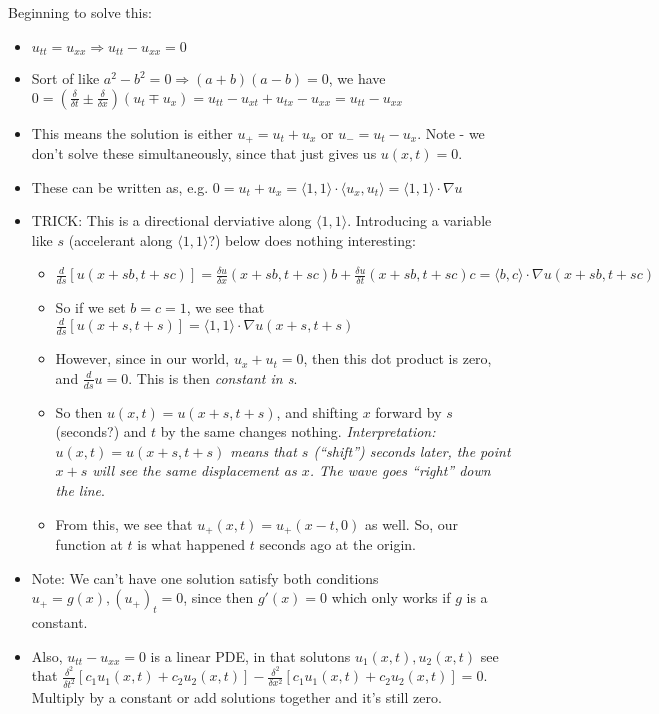 \documentclass[11pt, oneside]{article}   	%
\begin{document}
Beginning to solve this:
\begin{itemize}
\item $u_{tt} = u_{xx} \Rightarrow u_{tt} - u_{xx} = 0$
\item Sort of like $a^2 - b^2 = 0 \Rightarrow (a+b)(a-b) = 0$, we have $0 = (\frac{\delta}{\delta t} \pm \frac{\delta}{\delta x})(u_t \mp u_x) 
= u_{tt} - u_{xt} + u_{tx} - u_{xx} = u_{tt} - u_{xx}$
\item This means the solution is either $u_+ = u_{t} + u_{x}$ or $u_- = u_{t} - u_{x}$.  Note - we don't solve these simultaneously, since that just gives us $u(x,t) = 0$.
\item These can be written as, e.g. $0 = u_t + u_x = \langle 1, 1 \rangle \cdot \langle u_x, u_t  \rangle =  \langle 1, 1 \rangle \cdot \nabla u$
\item TRICK: This is a directional derviative along $\langle 1, 1 \rangle$.  Introducing a variable like $s$ (accelerant along $\langle 1,1 \rangle $?) below does nothing interesting:
\begin{itemize}
\item $\frac{d}{ds}[u(x+sb, t+sc)] = \frac{\delta u}{\delta x}(x+sb,t+sc)b +  \frac{\delta u}{\delta t}(x+sb,t+sc)c = \langle b, c\rangle \cdot \nabla u(x+sb, t+sc)$
\item So if we set $b = c =1$, we see that $\frac{d}{ds}[u(x+s, t+s)] = \langle 1, 1\rangle \cdot \nabla u(x+s, t+s)$  
\item However, since in our world, $u_x + u_t = 0$, then this dot product is zero, and $\frac{d}{ds} u = 0$.  This is then \emph{constant in s}.
\item So then $u(x,t) = u(x+s, t+s)$, and shifting $x$ forward by $s$ (seconds?) and $t$ by the same changes nothing.  \emph{Interpretation: $u(x,t) = u(x+s, t+s)$ means that $s$ (``shift'') seconds later, the point $x+s$ will see the same displacement as $x$.  The wave goes ``right'' down the line}.
\item From this, we see that $u_+(x, t) = u_+(x-t, 0)$ as well.  So, our function at $t$ is what happened $t$ seconds ago at the origin.  
\end{itemize}
\item Note: We can't have one solution satisfy both conditions $u_+ = g(x), (u_+)_t = 0$, since then $g'(x) = 0$ which only works if $g$ is a constant.
\item Also, $u_{tt} - u_{xx} = 0$ is a linear PDE, in that solutons $u_1(x,t), u_2(x,t)$ see that $\frac{\delta^2}{\delta t^2}[c_1u_1(x,t) + c_2u_2(x,t)] - \frac{\delta^2}{\delta x^2}[c_1u_1(x,t) + c_2u_2(x,t)] = 0$.  Multiply by a constant or add solutions together and it's still zero.

\end{itemize}
\end{document}
